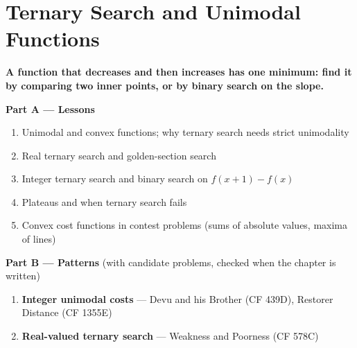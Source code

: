 \chapter{Ternary Search and Unimodal Functions}
\label{ch:ternary}

\begin{tcolorbox}[enhanced, colback=white, colframe=secondaryblue, boxrule=1pt, arc=2mm]
\textbf{\large\textcolor{primaryblue}{A function that decreases and then increases has one minimum: find it by comparing two inner points, or by binary search on the slope.}}
\end{tcolorbox}


\begin{plannedbox}
\textbf{Part A --- Lessons}
\begin{enumerate}[leftmargin=*, label=\textbf{A\arabic*.}, itemsep=1pt]
    \item Unimodal and convex functions; why ternary search needs strict unimodality
    \item Real ternary search and golden-section search
    \item Integer ternary search and binary search on $f(x+1) - f(x)$
    \item Plateaus and when ternary search fails
    \item Convex cost functions in contest problems (sums of absolute values, maxima of lines)
\end{enumerate}
\textbf{Part B --- Patterns} (with candidate problems, checked when the chapter is written)
\begin{enumerate}[leftmargin=*, label=\textbf{P\arabic*.}, itemsep=1pt]
    \item \textbf{Integer unimodal costs} --- Devu and his Brother {\small\color{darkgray}(CF 439D)}, Restorer Distance {\small\color{darkgray}(CF 1355E)}
    \item \textbf{Real-valued ternary search} --- Weakness and Poorness {\small\color{darkgray}(CF 578C)}
\end{enumerate}
\end{plannedbox}
